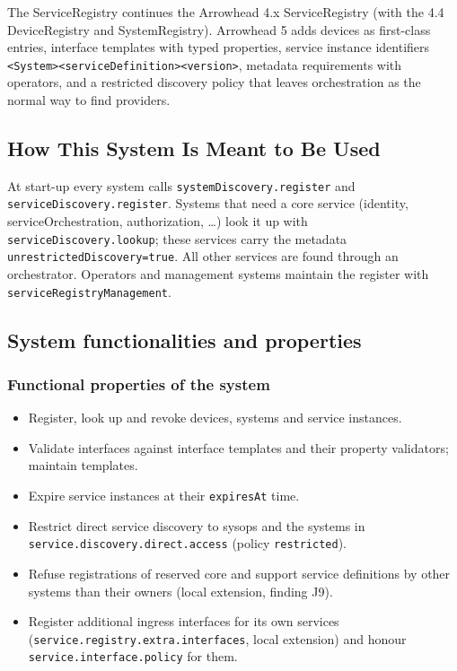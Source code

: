 \documentclass[a4paper]{arrowhead}
\begin{document}
The ServiceRegistry continues the Arrowhead 4.x ServiceRegistry (with the 4.4 DeviceRegistry and SystemRegistry). Arrowhead 5 adds devices as first-class entries, interface templates with typed properties, service instance identifiers \texttt{\textless{}System\textgreater{}\textbar{}\allowbreak{}\textless{}service\allowbreak{}Definition\textgreater{}\textbar{}\allowbreak{}\textless{}version\textgreater{}}, metadata requirements with operators, and a restricted discovery policy that leaves orchestration as the normal way to find providers.

\subsection{How This System Is Meant to Be Used}
\label{sec:use}

At start-up every system calls \texttt{system\allowbreak{}Discovery.\allowbreak{}register} and \texttt{service\allowbreak{}Discovery.\allowbreak{}register}. Systems that need a core service (identity, service\allowbreak{}Orchestration, authorization, \ldots{}) look it up with \texttt{service\allowbreak{}Discovery.\allowbreak{}lookup}; these services carry the metadata \texttt{unrestricted\allowbreak{}Discovery=\allowbreak{}true}. All other services are found through an orchestrator. Operators and management systems maintain the register with \texttt{service\allowbreak{}Registry\allowbreak{}Management}.

\subsection{System functionalities and properties}
\label{sec:properties}

\subsubsection{Functional properties of the system}

\begin{itemize}
  \item Register, look up and revoke devices, systems and service instances.
  \item Validate interfaces against interface templates and their property validators; maintain templates.
  \item Expire service instances at their \texttt{expiresAt} time.
  \item Restrict direct service discovery to sysops and the systems in \texttt{service.\allowbreak{}discovery.\allowbreak{}direct.\allowbreak{}access} (policy \texttt{restricted}).
  \item Refuse registrations of reserved core and support service definitions by other systems than their owners (local extension, finding J9).
  \item Register additional ingress interfaces for its own services (\texttt{service.\allowbreak{}registry.\allowbreak{}extra.\allowbreak{}interfaces}, local extension) and honour \texttt{service.\allowbreak{}interface.\allowbreak{}policy} for them.
\end{itemize}
\end{document}
